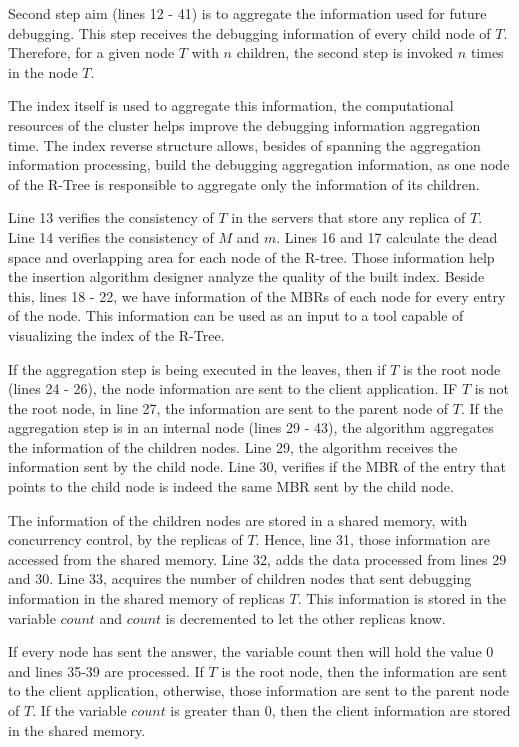 	Second step aim (lines 12 - 41) is to aggregate the information used for future debugging. This step receives the debugging information of every child node of $T$. Therefore, for a given node $T$ with $n$ children, the second step is invoked $n$ times in the node $T$.

	The index itself is used to aggregate this information, the computational resources of the cluster helps improve the debugging information aggregation time. The index reverse structure allows, besides of spanning the aggregation information processing, build the debugging aggregation information, as one node of the R-Tree is responsible to aggregate only the information of its children. 

	Line 13 verifies the consistency of $T$ in the servers that store any replica of $T$. Line 14 verifies the consistency of $M$ and $m$. Lines 16 and 17 calculate the dead space and overlapping area for each node of the R-tree. Those information help the insertion algorithm designer analyze the quality of the built index. Beside this, lines 18 - 22, we have information of the MBRs of each node for every entry of the node. This information can be used as an input to a tool capable of visualizing the index of the R-Tree.
	
	If the aggregation step is being executed in the leaves, then if  $T$ is the root node (lines 24 - 26), the node information are sent to the client application. IF $T$ is not the root node, in line 27, the information are sent to the parent node of $T$. If the aggregation step is in an internal node (lines 29 - 43), the algorithm aggregates the information of the children nodes. Line 29, the algorithm receives the information sent by the child node. Line 30, verifies if the MBR of the entry that points to the child node is indeed the same MBR sent by the child node.
	
	The information of the children nodes are stored in a shared memory, with concurrency control, by the replicas of $T$. Hence, line 31, those information are accessed from the shared memory. Line 32, adds the data processed from lines 29 and 30. Line 33, acquires the number of children nodes that sent debugging information in the shared memory of replicas $T$. This information is stored in the variable $count$ and $count$ is decremented to let the other replicas know.
	
	If every node has sent the answer, the variable count then will hold the value 0 and lines 35-39 are processed. If $T$ is the root node, then the information are sent to the client application, otherwise, those information are sent to the parent node of $T$. If the variable $count$ is greater than 0, then the client information are stored in the shared memory.	
		
